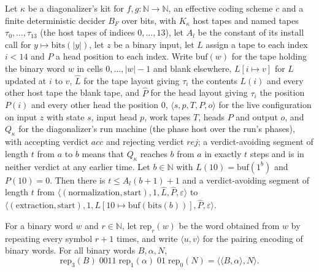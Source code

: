 \begin{theorem}
\label{Turing.NTimeDiag.dz_norm}
\leanok
{}
Let $\kappa$ be a diagonalizer's kit for $f, g : \mathbb{N} \to \mathbb{N}$, an effective coding scheme $c$ and a finite deterministic decider $B_F$ over bits, with $K_\kappa$ host tapes and named tapes $\tau_0, \dots, \tau_{13}$ (the host tapes of indices $0, \dots, 13$), let $A_l$ be the constant of its install call for $y \mapsto \mathrm{bits}(|y|)$, let $z$ be a binary input, let $L$ assign a tape to each index $i < 14$ and $P$ a head position to each index. Write $\mathrm{buf}(w)$ for the tape holding the binary word $w$ in cells $0, \dots, |w| - 1$ and blank elsewhere, $L[i \mapsto v]$ for $L$ updated at $i$ to $v$, $\hat L$ for the tape layout giving $\tau_i$ the contents $L(i)$ and every other host tape the blank tape, and $\hat P$ for the head layout giving $\tau_i$ the position $P(i)$ and every other head the position $0$, $\langle s, p, T, P, o\rangle$ for the live configuration on input $z$ with state $s$, input head $p$, work tapes $T$, heads $P$ and output $o$, and $Q_\kappa$ for the diagonalizer's run machine (the phase host over the run's phases), with accepting verdict $\mathit{acc}$ and rejecting verdict $\mathit{rej}$; a verdict-avoiding segment of length $t$ from $a$ to $b$ means that $Q_\kappa$ reaches $b$ from $a$ in exactly $t$ steps and is in neither verdict at any earlier time. Let $b \in \mathbb{N}$ with $L(10) = \mathrm{buf}(1^b)$ and $P(10) = 0$. Then there is $t \le A_l(b + 1) + 1$ and a verdict-avoiding segment of length $t$ from $\langle (\text{normalization}, \text{start}), 1, \hat L, \hat P, \varepsilon\rangle$ to $\langle (\text{extraction}, \text{start}), 1, \widehat{L[10 \mapsto \mathrm{buf}(\mathrm{bits}(b))]}, \hat P, \varepsilon\rangle$.
\end{theorem}

\begin{theorem}
\label{Turing.NTimeDiag.dz_core_word}
\leanok
{}
For a binary word $w$ and $r \in \mathbb{N}$, let $\mathrm{rep}_r(w)$ be the word obtained from $w$ by repeating every symbol $r + 1$ times, and write $\langle u, v\rangle$ for the pairing encoding of binary words. For all binary words $B, \alpha, N$, \[ \mathrm{rep}_3(B)\;0011\;\mathrm{rep}_1(\alpha)\;01\;\mathrm{rep}_0(N) = \langle\langle B, \alpha\rangle, N\rangle. \]
\end{theorem}


